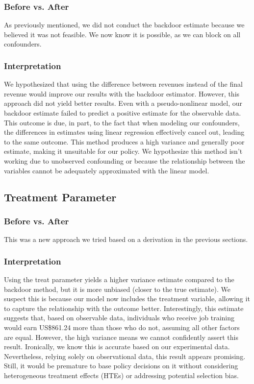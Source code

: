\documentclass[12pt]{article}
\begin{document}
\subsubsection*{Before vs. After}

As previously mentioned, we did not conduct the backdoor estimate because we believed it was not feasible. We now know it is possible, as we can block on all confounders.

\subsubsection*{Interpretation}

We hypothesized that using the difference between revenues instead of the final revenue would improve our results with the backdoor estimator. However, this approach did not yield better results. Even with a pseudo-nonlinear model, our backdoor estimate failed to predict a positive estimate for the observable data. This outcome is due, in part, to the fact that when modeling our confounders, the differences in estimates using linear regression effectively cancel out, leading to the same outcome. This method produces a high variance and generally poor estimate, making it unsuitable for our policy. We hypothesize this method isn't working due to unobserved confounding or because the relationship between the variables cannot be adequately approximated with the linear model.
\subsection{Treatment Parameter}

\subsubsection*{Before vs. After}

This was a new approach we tried based on a derivation in the previous sections.

\subsubsection*{Interpretation}

Using the treat parameter yields a higher variance estimate compared to the backdoor method, but it is more unbiased (closer to the true estimate). We suspect this is because our model now includes the treatment variable, allowing it to capture the relationship with the outcome better. Interestingly, this estimate suggests that, based on observable data, individuals who receive job training would earn US\$861.24 more than those who do not, assuming all other factors are equal. However, the high variance means we cannot confidently assert this result. Ironically, we know this is accurate based on our experimental data. Nevertheless, relying solely on observational data, this result appears promising. Still, it would be premature to base policy decisions on it without considering heterogeneous treatment effects (HTEs) or addressing potential selection bias.
\end{document}
